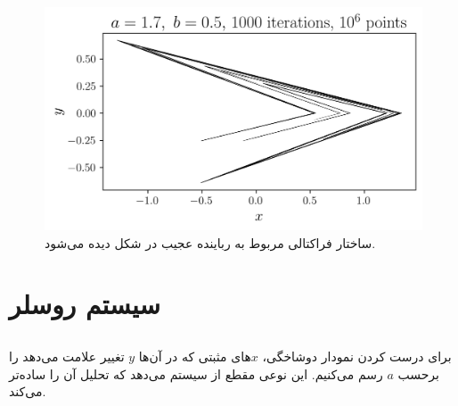 \documentclass[12pt,a4paper]{article}
\begin{document}
	\subsection{}
	\begin{figure}[h!]
		\centering
		\includegraphics[width=\linewidth]{fig/12.2.18}
		\caption{ساختار فراکتالی مربوط به رباینده عجیب در شکل دیده می‌شود.}
	\end{figure}
	
	\section{سیستم روسلر}
	\subsection{}
	برای درست کردن نمودار دوشاخگی، $x$های مثبتی که در آن‌ها $y$ تغییر علامت می‌دهد را برحسب $a$ رسم می‌کنیم.
	این نوعی مقطع از سیستم می‌دهد که تحلیل آن را ساده‌تر می‌کند.
	
\end{document}
